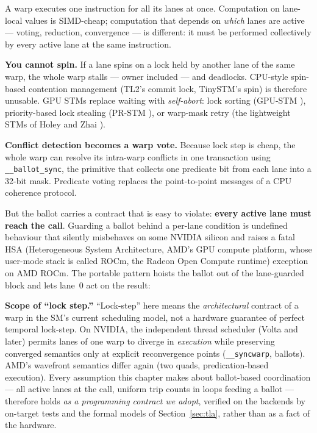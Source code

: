 A warp executes one instruction for all its lanes at once. Computation on
lane-local values is SIMD-cheap; computation that depends on \emph{which}
lanes are active --- voting, reduction, convergence --- is different: it must
be performed collectively by every active lane at the same instruction.

\textbf{You cannot spin.} If a lane spins on a lock held by another lane of
the same warp, the whole warp stalls --- owner included --- and deadlocks.
CPU-style spin-based contention management (TL2's commit lock, TinySTM's
spin) \cite{dice06tl2,riegel06disc} is therefore unusable. GPU STMs replace
waiting with \emph{self-abort}: lock sorting (GPU-STM
\cite{xu14gpustm}), priority-based lock stealing (PR-STM
\cite{shen15prstm}), or warp-mask retry (the lightweight STMs of Holey and
Zhai \cite{holey14}).

\textbf{Conflict detection becomes a warp vote.} Because lock step is cheap,
the whole warp can resolve its intra-warp conflicts in one transaction using
\texttt{\_\_ballot\_sync}, the primitive that collects one predicate bit from
each lane into a 32-bit mask. Predicate voting replaces the point-to-point
messages of a CPU coherence protocol.

But the ballot carries a contract that is easy to violate:
\textbf{every active lane must reach the call}. Guarding a ballot behind a
per-lane condition is undefined behaviour that silently misbehaves on some
NVIDIA silicon and raises a fatal HSA (Heterogeneous System Architecture, AMD's GPU compute platform, whose user-mode stack is called ROCm, the Radeon Open Compute runtime) exception on AMD ROCm. The portable
pattern hoists the ballot out of the lane-guarded block and lets lane~0 act
on the result:

\medskip
\noindent\textbf{Scope of ``lock step.''} ``Lock-step'' here means the
\textit{architectural} contract of a warp in the SM's current scheduling
model, not a hardware guarantee of perfect temporal lock-step. On NVIDIA,
the independent thread scheduler (Volta and later) permits lanes of one
warp to diverge in \emph{execution} while preserving converged semantics
only at explicit reconvergence points (\texttt{\_\_syncwarp}, ballots).
AMD's wavefront semantics differ again (two quads, predication-based
execution). Every assumption this chapter makes about ballot-based
coordination --- all active lanes at the call, uniform trip counts in
loops feeding a ballot --- therefore holds \emph{as a programming
contract we adopt}, verified on the backends by on-target tests and the
formal models of Section~\ref{sec:tla}, rather than as a fact of the
hardware.


